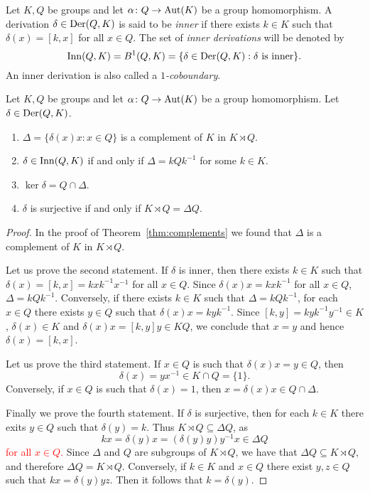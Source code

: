 Let $K,Q$ be groups and let $\alpha\colon Q\rightarrow \operatorname{Aut}(K)$ be a group homomorphism.
A derivation $\delta\in\operatorname{Der}(Q,K)$ is said to be {\em inner} if there exists $k\in K$ 
such that $\delta(x)=[k,x]$ for all $x\in Q$. The set of 
{\em inner derivations} will be denoted by 
\[
		\mathrm{Inn}(Q,K)=B^1(Q,K)=\{\delta\in\operatorname{Der}(Q,K):\text{$\delta$ is inner}\}.
\]
An inner derivation is also called a {\em $1$-coboundary}.

\begin{theorem}[Sysak]
	\label{theorem:Sysak}
	Let $K,Q$ be groups and let $\alpha\colon Q\rightarrow \operatorname{Aut}(K)$ be a group homomorphism. Let
	$\delta\in\operatorname{Der}(Q,K)$.
	\begin{enumerate}
		\item $\Delta=\{\delta(x)x:x\in Q\}$ is a complement of $K$ in $K\rtimes Q$.
		\item $\delta\in\mathrm{Inn}(Q,K)$ if and only if $\Delta=kQ k^{-1}$ for some $k\in K$.
		\item $\ker\delta=Q\cap\Delta$.
		\item $\delta$ is surjective if and only if $K\rtimes Q=\Delta Q$.
	\end{enumerate}
\end{theorem}

\begin{proof}
	In the proof of Theorem~\ref{thm:complements} we 
	found that $\Delta$ is a complement of $K$ in $K\rtimes Q$. 

	Let us prove the second statement. If $\delta$ is inner, then there exists 
    $k\in K$ such that $\delta(x)=[k,x]=kxk^{-1}x^{-1}$ for all $x\in
	Q$. Since $\delta(x)x=kxk^{-1}$ for all $x\in Q$,  $\Delta=kQk^{-1}$.
	Conversely, if there exists $k\in K$ such that $\Delta=kQk^{-1}$, for each 
	$x\in Q$ there exists $y\in Q$ such that $\delta(x)x=kyk^{-1}$. Since
	$[k,y]=kyk^{-1}y^{-1}\in K$, $\delta(x)\in K$ and $\delta(x)x=[k,y]y\in KQ$,
	we conclude that  $x=y$ and hence $\delta(x)=[k,x]$. 

	Let us prove the third statement. If $x\in Q$ is such that $\delta(x)x=y\in
	Q$, then \[
	\delta(x)=yx^{-1}\in K\cap Q=\{1\}.
	\]
	Conversely, if $x\in Q$
	is such that $\delta(x)=1$, then $x=\delta(x)x\in Q\cap\Delta$. 

	Finally we prove the fourth statement. If $\delta$ is surjective, then for each 
	$k\in K$ there exits $y\in Q$ such that $\delta(y)=k$. Thus $K\rtimes Q\subseteq
	\Delta Q$, as 
	\[
	kx=\delta(y)x=(\delta(y)y)y^{-1}x\in \Delta Q
	\]
	\textcolor{red}{for all $x\in Q$.}
	Since $\Delta$ and $Q$ are subgroups of $K\rtimes Q$, we have that 
	$\Delta Q\subseteq K\rtimes Q$, and therefore $\Delta Q=K\rtimes Q$.
	Conversely, if $k\in K$ and $x\in Q$ there exist  
	$y,z\in Q$ such that $kx=\delta(y)yz$. Then it follows that 
	$k=\delta(y)$. 
\end{proof}

